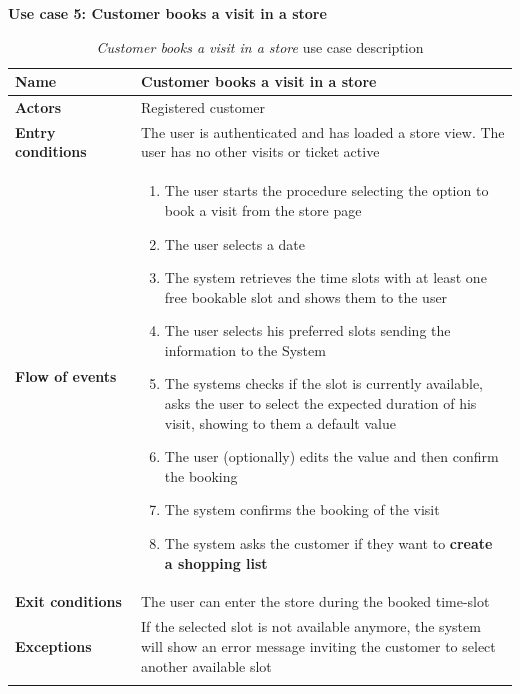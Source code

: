 \clearpage
\textbf{Use case 5: Customer books a visit in a store}
\smallskip
{}
\begin{longtable}{p{0.25\linewidth}p{0.75\linewidth}}
    \toprule
    \textbf{Name}             & \textbf{Customer books a visit in a store}                                                                                                  \\
    \midrule
    \textbf{Actors}           & Registered customer                                                                                                                         \\
    \midrule
    \textbf{Entry conditions} & The user is authenticated and has loaded a store view. The user has no other visits or ticket active                                        \\
    \midrule
    \textbf{Flow of events}   &
    \begin{enumerate}
        \item The user starts the procedure selecting the option to book a visit from the store page
        \item The user selects a date
        \item The system retrieves the time slots with at least one free bookable slot and shows them to the user
        \item The user selects his preferred slots sending the information to the System
        \item The systems checks if the slot is currently available, asks the user to select the expected duration of his visit, showing to them a default value
        \item The user (optionally) edits the value and then confirm the booking
        \item The system confirms the booking of the visit
        \item The system asks the customer if they want to \textbf{create a shopping list}
    \end{enumerate}                                                                                                                                              \\
    \midrule
    \textbf{Exit conditions}  & The user can enter the store during the booked time-slot                                                                                    \\
    \midrule
    \textbf{Exceptions}       & If the selected slot is not available anymore, the system will show an error message inviting the customer to select another available slot \\
    \bottomrule
    \caption{\emph{Customer books a visit in a store} use case description}
\end{longtable}

